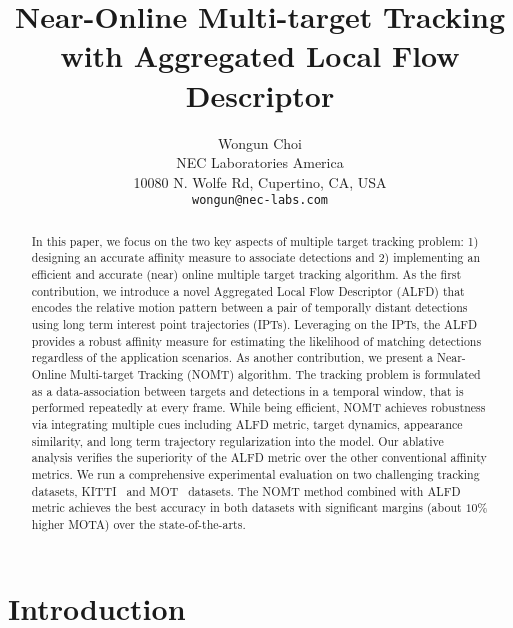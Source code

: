 \documentclass[10pt,twocolumn,letterpaper]{article}
\begin{document}
\title{Near-Online Multi-target Tracking with Aggregated Local Flow Descriptor}

\author{Wongun Choi\\
NEC Laboratories America\\
10080 N. Wolfe Rd, Cupertino, CA, USA\\
{\tt\small wongun@nec-labs.com}
}

\maketitle


\begin{abstract}
In this paper, we focus on the two key aspects of multiple target tracking problem: 1) designing an accurate affinity measure to associate detections and 2) implementing an efficient and accurate (near) online multiple target tracking algorithm. As the first contribution, we introduce a novel Aggregated Local Flow Descriptor (ALFD) that encodes the relative motion pattern between a pair of temporally distant detections using long term interest point trajectories (IPTs). Leveraging on the IPTs, the ALFD provides a robust affinity measure for estimating the likelihood of matching detections regardless of the application scenarios. As another contribution, we present a Near-Online Multi-target Tracking (NOMT) algorithm. The tracking problem is formulated as a data-association between targets and detections in a temporal window, that is performed repeatedly at every frame. While being efficient, NOMT achieves robustness via integrating multiple cues including ALFD metric, target dynamics, appearance similarity, and long term trajectory regularization into the model. Our ablative analysis verifies the superiority of the ALFD metric over the other conventional affinity metrics. We run a comprehensive experimental evaluation on two challenging tracking datasets, KITTI~\cite{Geiger2012CVPR} and MOT~\cite{MOTChallenge} datasets. The NOMT method combined with ALFD metric achieves the best accuracy in both datasets with significant margins (about $10\%$ higher MOTA) over the state-of-the-arts.
\end{abstract}

\section{Introduction}
 
\end{document}
